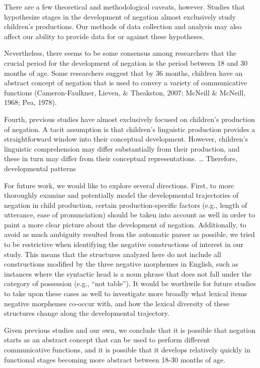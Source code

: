 \documentclass[
  english,
  man,floatsintext]{apa6}
\begin{document}
There are a few theoretical and methodological caveats, however. Studies that hypothesize stages in the development of negation almost exclusively study children's productions. Our methods of data collection and analysis may also affect our ability to provide data for or against these hypotheses.

Nevertheless, there seems to be some consensus among researchers that the crucial period for the development of negation is the period between 18 and 30 months of age. Some researchers suggest that by 36 months, children have an abstract concept of negation that is used to convey a variety of communicative functions (Cameron-Faulkner, Lieven, \& Theakston, 2007; McNeill \& McNeill, 1968; Pea, 1978).

Fourth, previous studies have almost exclusively focused on children's production of negation. A tacit assumption is that children's linguistic production provides a straightforward window into their conceptual development. However, children's linguistic comprehension may differ substantially from their production, and these in turn may differ from their conceptual representations. \ldots{} Therefore, developmental patterns

For future work, we would like to explore several directions. First, to more thoroughly examine and potentially model the developmental trajectories of negation in child production, certain production-specific factors (e.g., length of utterance, ease of pronunciation) should be taken into account as well in order to paint a more clear picture about the development of negation. Additionally, to avoid as much ambiguity resulted from the automatic parser as possible, we tried to be restrictive when identifying the negative constructions of interest in our study. This means that the structures analyzed here do not include all constructions modified by the three negative morphemes in English, such as instances where the syntactic head is a noun phrase that does not fall under the category of possession (e.g., ``not table''). It would be worthwile for future studies to take upon these cases as well to investigate more broadly what lexical items negative morphemes co-occur with, and how the lexical diversity of these structures change along the developmental trajectory.

Given previous studies and our own, we conclude that it is possible that negation starts as an abstract concept that can be used to perform different communicative functions, and it is possible that it develops relatively quickly in functional stages becoming more abstract between 18-30 months of age.
\end{document}
